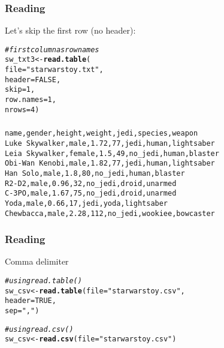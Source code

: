 \documentclass[12pt]{beamer}\usepackage[]{graphicx}\usepackage[]{color}
\makeatletter
\newcommand{\hlnum}[1]{\textcolor[rgb]{0.686,0.059,0.569}{#1}}%
\newcommand{\hlstr}[1]{\textcolor[rgb]{0.192,0.494,0.8}{#1}}%
\newcommand{\hlcom}[1]{\textcolor[rgb]{0.678,0.584,0.686}{\textit{#1}}}%
\newcommand{\hlstd}[1]{\textcolor[rgb]{0.345,0.345,0.345}{#1}}%
\newcommand{\hlkwb}[1]{\textcolor[rgb]{0.69,0.353,0.396}{#1}}%
\newcommand{\hlkwc}[1]{\textcolor[rgb]{0.333,0.667,0.333}{#1}}%
\newcommand{\hlkwd}[1]{\textcolor[rgb]{0.737,0.353,0.396}{\textbf{#1}}}%
\newenvironment{kframe}{%
 \def\at@end@of@kframe{}%
 \ifinner\ifhmode%
  \def\at@end@of@kframe{\end{minipage}}%
  \begin{minipage}{\columnwidth}%
 \fi\fi%
 \def\FrameCommand##1{\hskip\@totalleftmargin \hskip-\fboxsep
 \colorbox{shadecolor}{##1}\hskip-\fboxsep
     \hskip-\linewidth \hskip-\@totalleftmargin \hskip\columnwidth}%
 \MakeFramed {\advance\hsize-\width
   \@totalleftmargin\z@ \linewidth\hsize
   \@setminipage}}%
 {\par\unskip\endMakeFramed%
 \at@end@of@kframe}
\newenvironment{knitrout}{}{} %
\makeatother
\begin{document}

\begin{frame}[fragile]
\frametitle{Reading }

Let's skip the first row (no header):

\begin{knitrout}\footnotesize
{}\color{fgcolor}\begin{kframe}
\begin{alltt}
\hlcom{# first column as row names}
\hlstd{sw_txt3} \hlkwb{<-} \hlkwd{read.table}\hlstd{(}
  \hlkwc{file} \hlstd{=} \hlstr{"starwarstoy.txt"}\hlstd{,}
  \hlkwc{header} \hlstd{=} \hlnum{FALSE}\hlstd{,}
  \hlkwc{skip} \hlstd{=} \hlnum{1}\hlstd{,}
  \hlkwc{row.names} \hlstd{=} \hlnum{1}\hlstd{,}
  \hlkwc{nrows} \hlstd{=} \hlnum{4}\hlstd{)}
\end{alltt}
\end{kframe}
\end{knitrout}

\end{frame}


\begin{frame}[fragile]
\frametitle{}

{\small
\begin{verbatim}
name,gender,height,weight,jedi,species,weapon
Luke Skywalker,male,1.72,77,jedi,human,lightsaber
Leia Skywalker,female,1.5,49,no_jedi,human,blaster
Obi-Wan Kenobi,male,1.82,77,jedi,human,lightsaber
Han Solo,male,1.8,80,no_jedi,human,blaster
R2-D2,male,0.96,32,no_jedi,droid,unarmed
C-3PO,male,1.67,75,no_jedi,droid,unarmed
Yoda,male,0.66,17,jedi,yoda,lightsaber
Chewbacca,male,2.28,112,no_jedi,wookiee,bowcaster
\end{verbatim}
}

\end{frame}


\begin{frame}[fragile]
\frametitle{Reading }

Comma delimiter 

\begin{knitrout}\footnotesize
{}\color{fgcolor}\begin{kframe}
\begin{alltt}
\hlcom{# using read.table()}
\hlstd{sw_csv} \hlkwb{<-} \hlkwd{read.table}\hlstd{(}\hlkwc{file} \hlstd{=} \hlstr{"starwarstoy.csv"}\hlstd{,}
                     \hlkwc{header} \hlstd{=} \hlnum{TRUE}\hlstd{,}
                     \hlkwc{sep} \hlstd{=} \hlstr{","}\hlstd{)}

\hlcom{# using read.csv()}
\hlstd{sw_csv} \hlkwb{<-} \hlkwd{read.csv}\hlstd{(}\hlkwc{file} \hlstd{=} \hlstr{"starwarstoy.csv"}\hlstd{)}
\end{alltt}
\end{kframe}
\end{knitrout}

\end{frame}
\end{document}
